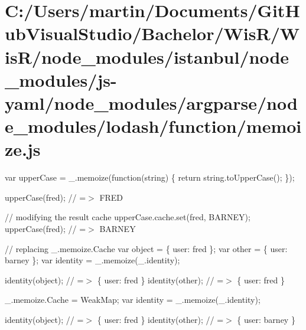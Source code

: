 \hypertarget{_c_1_2_users_2martin_2_documents_2_git_hub_visual_studio_2_bachelor_2_wis_r_2_wis_r_2node_modulead9f024545131f9c5af2746b5f76e290}{}\section{C\+:/\+Users/martin/\+Documents/\+Git\+Hub\+Visual\+Studio/\+Bachelor/\+Wis\+R/\+Wis\+R/node\+\_\+modules/istanbul/node\+\_\+modules/js-\/yaml/node\+\_\+modules/argparse/node\+\_\+modules/lodash/function/memoize.\+js}
var upper\+Case = \+\_\+.\+memoize(function(string) \{ return string.\+to\+Upper\+Case(); \});

upper\+Case(\textquotesingle{}fred\textquotesingle{}); // =$>$ \textquotesingle{}F\+R\+E\+D\textquotesingle{}

// modifying the result cache upper\+Case.\+cache.\+set(\textquotesingle{}fred\textquotesingle{}, \textquotesingle{}B\+A\+R\+N\+E\+Y\textquotesingle{}); upper\+Case(\textquotesingle{}fred\textquotesingle{}); // =$>$ \textquotesingle{}B\+A\+R\+N\+E\+Y\textquotesingle{}

// replacing {\ttfamily \+\_\+.\+memoize.\+Cache} var object = \{ \textquotesingle{}user\textquotesingle{}\+: \textquotesingle{}fred\textquotesingle{} \}; var other = \{ \textquotesingle{}user\textquotesingle{}\+: \textquotesingle{}barney\textquotesingle{} \}; var identity = \+\_\+.\+memoize(\+\_\+.\+identity);

identity(object); // =$>$ \{ \textquotesingle{}user\textquotesingle{}\+: \textquotesingle{}fred\textquotesingle{} \} identity(other); // =$>$ \{ \textquotesingle{}user\textquotesingle{}\+: \textquotesingle{}fred\textquotesingle{} \}

\+\_\+.\+memoize.\+Cache = Weak\+Map; var identity = \+\_\+.\+memoize(\+\_\+.\+identity);

identity(object); // =$>$ \{ \textquotesingle{}user\textquotesingle{}\+: \textquotesingle{}fred\textquotesingle{} \} identity(other); // =$>$ \{ \textquotesingle{}user\textquotesingle{}\+: \textquotesingle{}barney\textquotesingle{} \}


